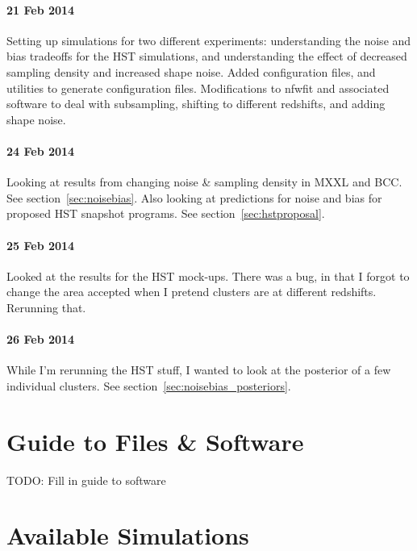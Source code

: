 \documentclass[11pt]{article}
\begin{document}
\paragraph{21 Feb 2014}
Setting up simulations for two different experiments: understanding the noise and bias tradeoffs for the HST simulations, and understanding the effect of decreased sampling density and increased shape noise. Added configuration files, and utilities to generate configuration files. Modifications to nfwfit and associated software to deal with subsampling, shifting to different redshifts, and adding shape noise.

\paragraph{24 Feb 2014}
Looking at results from changing noise \& sampling density in MXXL and BCC. See section~\ref{sec:noisebias}.
Also looking at predictions for noise and bias for proposed HST snapshot programs. See section~\ref{sec:hstproposal}.

\paragraph{25 Feb 2014}
Looked at the results for the HST mock-ups. There was a bug, in that I forgot to change the area accepted when I pretend clusters are at different redshifts. Rerunning that.

\paragraph{26 Feb 2014}
While I'm rerunning the HST stuff, I wanted to look at the posterior of a few individual clusters. See section~\ref{sec:noisebias_posteriors}.



\section{Guide to Files \& Software}

TODO: Fill in guide to software




\section{Available Simulations}
\end{document}
